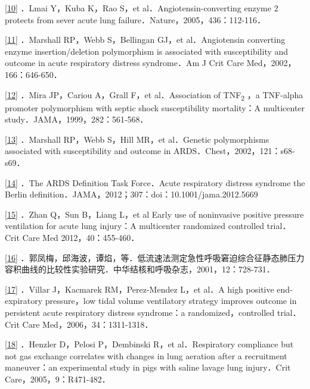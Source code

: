 \protect\hyperlink{text00011.htmlux5cux23ch10-10-back}{{[}10{]}} ．Lmai
Y，Kuba K，Rao S，et al．Angiotensin-converting enzyme 2 protects from
sever acute lung failure．Nature，2005，436：112-116．

\protect\hyperlink{text00011.htmlux5cux23ch11-10-back}{{[}11{]}}
．Marshall RP，Webb S，Bellingan GJ，et al．Angiotensin converting
enzyme insertion/deletion polymorphism is associated with susceptibility
and outcome in acute respiratory distress syndrome．Am J Crit Care
Med，2002，166：646-650．

\protect\hyperlink{text00011.htmlux5cux23ch12-10-back}{{[}12{]}} ．Mira
JP，Cariou A，Grall F，et al．Association of TNF\textsubscript{2} ，a
TNF-alpha promoter polymorphism with septic shock susceptibility
mortality：A multicenter study．JAMA，1999，282：561-568．

\protect\hyperlink{text00011.htmlux5cux23ch13-10-back}{{[}13{]}}
．Marshall RP，Webb S，Hill MR，et al．Genetic polymorphisms associated
with susceptibility and outcome in ARDS．Chest，2002，121：s68-s69．

\protect\hyperlink{text00011.htmlux5cux23ch14-10-back}{{[}14{]}} ．The
ARDS Definition Task Force．Acute respiratory distress syndrome the
Berlin definition．JAMA，2012；307：doi：10.1001/jama.2012.5669

\protect\hyperlink{text00011.htmlux5cux23ch15-10-back}{{[}15{]}} ．Zhan
Q，Sun B，Liang L，et al Early use of noninvasive positive pressure
ventilation for acute lung injury：A multicenter randomized controlled
trial．Crit Care Med 2012，40：455-460．

\protect\hyperlink{text00011.htmlux5cux23ch16-10-back}{{[}16{]}}
．郭凤梅，邱海波，谭焰，等．低流速法测定急性呼吸窘迫综合征静态肺压力容积曲线的比较性实验研究．中华结核和呼吸杂志，2001，12：728-731．

\protect\hyperlink{text00011.htmlux5cux23ch17-10-back}{{[}17{]}}
．Villar J，Kacmarek RM，Perez-Mendez L，et al．A high positive
end-expiratory pressure，low tidal volume ventilatory strategy improves
outcome in persistent acute respiratory distress syndrome：a
randomized，controlled trial．Crit Care Med，2006，34：1311-1318．

\protect\hyperlink{text00011.htmlux5cux23ch18-10-back}{{[}18{]}}
．Henzler D，Pelosi P，Dembinski R，et al．Respiratory compliance but
not gas exchange correlates with changes in lung aeration after a
recruitment maneuver：an experimental study in pigs with saline lavage
lung injury．Crit Care，2005，9：R471-482．

